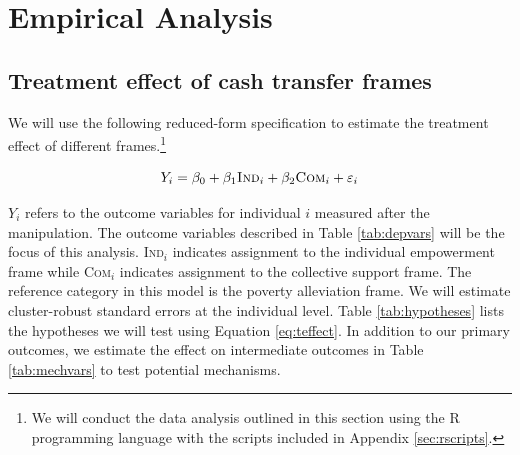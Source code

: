 \documentclass[11pt, a4paper]{article}\usepackage[]{graphicx}\usepackage[]{color}
\begin{document}
\section{Empirical Analysis}

    \subsection{Treatment effect of cash transfer frames}


        We will use the following reduced-form specification to estimate the treatment effect of different frames.\footnote{We will conduct the data analysis outlined in this section using the R programming language with the scripts included in Appendix \ref{sec:rscripts}.}

  		\begin{equation} \label{eq:teffect}
            Y_{i} = \beta_{0} + \beta_{1}\text{\textsc{Ind}}_{i} + \beta_{2}\text{\textsc{Com}}_{i} + \varepsilon_{i}
		\end{equation}


        $Y_{i}$ refers to the outcome variables for individual $i$ measured after the manipulation. The outcome variables described in Table \ref{tab:depvars} will be the focus of this analysis. \textsc{Ind}$_{i}$ indicates assignment to the individual empowerment frame while \textsc{Com}$_{i}$ indicates assignment to the collective support frame. The reference category in this model is the poverty alleviation frame. We will estimate cluster-robust standard errors at the individual level. Table \ref{tab:hypotheses} lists the hypotheses we will test using Equation \ref{eq:teffect}. In addition to our primary outcomes, we estimate the effect on intermediate outcomes in Table \ref{tab:mechvars} to test potential mechanisms.

        \begin{table}[t]
        \centering
        \caption{Primary outcome variables}
        \label{tab:depvars}
        \end{table}
\end{document}
